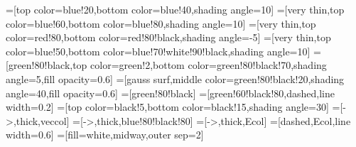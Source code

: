 \tikzset{>=latex} %

=[top color=blue!20,bottom color=blue!40,shading angle=10]
=[very thin,top color=blue!60,bottom color=blue!80,shading angle=10]
=[very thin,top color=red!80,bottom color=red!80!black,shading angle=-5]
=[very thin,top color=blue!50,bottom color=blue!70!white!90!black,shading angle=10]
=[green!80!black,top color=green!2,bottom color=green!80!black!70,shading angle=5,fill opacity=0.6]
=[gauss surf,middle color=green!80!black!20,shading angle=40,fill opacity=0.6]
=[green!80!black]
=[green!60!black!80,dashed,line width=0.2]
=[top color=black!5,bottom color=black!15,shading angle=30]
=[->,thick,veccol]
=[->,thick,blue!80!black!80]
=[->,thick,Ecol]
=[dashed,Ecol,line width=0.6]
=[fill=white,midway,outer sep=2]






  \def\H{2.0}
  \def\W{0.7}
  \def\L{3.5}
  \def\Ny{5}
  \def\Nz{4}
  \def\NEy{4}
  \def\NEz{3}
  \def\oEy{0.08*\W}
  \def\oEz{0.04*\H}
  \def\NE{6}
\def\NQ{7}
\def\E{1.1}
\def\R{0.1}

